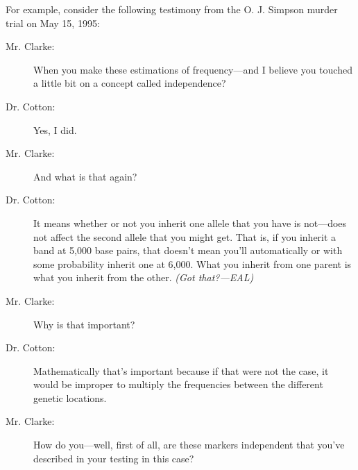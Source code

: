 For example, consider the following testimony from the O. J. Simpson
murder trial on May 15, 1995:
\begin{description}

\item[Mr. Clarke:] When you make these estimations of frequency---and
I believe you touched a little bit on a concept called independence?

\item[Dr. Cotton:] Yes, I did.

\item[Mr. Clarke:] And what is that again?

\item[Dr. Cotton:] It means whether or not you inherit one allele that
you have is not---does not affect the second allele that you might
get.  That is, if you inherit a band at 5,000 base pairs, that doesn't
mean you'll automatically or with some probability inherit one at
6,000.  What you inherit from one parent is what you inherit from the
other.  \emph{(Got that?---EAL)}

\item[Mr. Clarke:] Why is that important?

\item[Dr. Cotton:] Mathematically that's important because if that
were not the case, it would be improper to multiply the frequencies
between the different genetic locations.

\item[Mr. Clarke:] How do you---well, first of all, are these markers
independent that you've described in your testing in this case?

\end{description}

